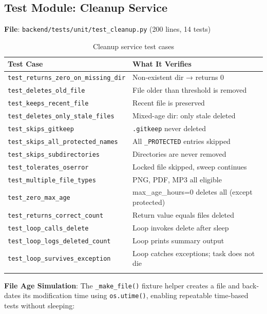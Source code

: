 \documentclass[12pt, a4paper]{article}
\newcommand{\file}[1]{\texttt{\color{accent}#1}}
\newcommand{\func}[1]{\texttt{\color{danger}#1}}
\begin{document}
\subsection{Test Module: Cleanup Service}
\label{sec:test_cleanup}

\textbf{File}: \file{backend/tests/unit/test\_cleanup.py} \quad (200 lines, 14 tests)

\begin{longtable}{p{6cm} p{7.5cm}}
  \toprule
  \textbf{Test Case} & \textbf{What It Verifies} \\
  \midrule
  \texttt{test\_returns\_zero\_on\_missing\_dir}  & Non-existent dir → returns 0 \\
  \texttt{test\_deletes\_old\_file}               & File older than threshold is removed \\
  \texttt{test\_keeps\_recent\_file}              & Recent file is preserved \\
  \texttt{test\_deletes\_only\_stale\_files}      & Mixed-age dir: only stale deleted \\
  \texttt{test\_skips\_gitkeep}                   & \texttt{.gitkeep} never deleted \\
  \texttt{test\_skips\_all\_protected\_names}     & All \texttt{\_PROTECTED} entries skipped \\
  \texttt{test\_skips\_subdirectories}            & Directories are never removed \\
  \texttt{test\_tolerates\_oserror}               & Locked file skipped, sweep continues \\
  \texttt{test\_multiple\_file\_types}            & PNG, PDF, MP3 all eligible \\
  \texttt{test\_zero\_max\_age}                   & max\_age\_hours=0 deletes all (except protected) \\
  \texttt{test\_returns\_correct\_count}          & Return value equals files deleted \\
  \texttt{test\_loop\_calls\_delete}              & Loop invokes delete after sleep \\
  \texttt{test\_loop\_logs\_deleted\_count}       & Loop prints summary output \\
  \texttt{test\_loop\_survives\_exception}        & Loop catches exceptions; task does not die \\
  \bottomrule
  \caption{Cleanup service test cases}
\end{longtable}

\textbf{File Age Simulation}:
The \func{\_make\_file()} fixture helper creates a file and back-dates its
modification time using \texttt{os.utime()}, enabling repeatable time-based
tests without sleeping:
\end{document}
